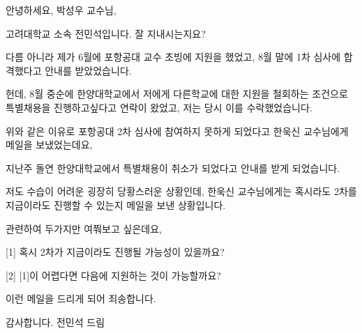



안녕하세요, 박성우 교수님,

고려대학교 소속 전민석입니다. 잘 지내시는지요?

다름 아니라 제가 6월에 포항공대 교수 초빙에 지원을 했었고, 8월 말에 1차 심사에 합격했다고 안내를 받았었습니다.

헌데, 8월 중순에 한양대학교에서 저에게 다른학교에 대한 지원을 철회하는 조건으로 특별채용을 진행하고싶다고 연락이 왔었고, 저는 당시 이를 수락했었습니다. 

위와 같은 이유로 포항공대 2차 심사에 참여하지 못하게 되었다고 한욱신 교수님에게 메일을 보냈었는데요,

지난주 돌연 한양대학교에서 특별채용이 취소가 되었다고 안내를 받게 되었습니다.

저도 수습이 어려운 굉장히 당황스러운 상황인데, 한욱신 교수님에게는 혹시라도 2차를 지금이라도 진행할 수 있는지 메일을 보낸 상황입니다. 

관련하여 두가지만 여쭤보고 싶은데요,

    [1] 혹시 2차가 지금이라도 진행될 가능성이 있을까요?

    [2] [1]이 어렵다면 다음에 지원하는 것이 가능할까요?

이런 메일을 드리게 되어 죄송합니다.

감사합니다.
전민석 드림
